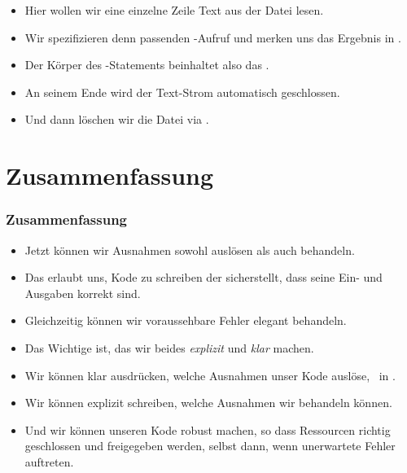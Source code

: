 \documentclass[aspectratio=169,mathserif,notheorems]{beamer}%
\begin{document}
\begin{frame}[t]
{{\begin{itemize}
{}%
%
%
%
%
%
%
%
\item<19-> Hier wollen wir eine einzelne Zeile Text aus der Datei lesen.%
%
\item<20-> Wir spezifizieren denn passenden -Aufruf und merken uns das Ergebnis in .%
%
\item<21-> Der Körper des -Statements beinhaltet also das .%
%
\item<22-> An seinem Ende wird der Text-Strom automatisch geschlossen.%
%
\item<23-> Und dann löschen wir die Datei via .%
\end{itemize}%
}}%
%
%
%
%
%
\end{frame}%
%
\section{Zusammenfassung}%
%
\begin{frame}%
\frametitle{Zusammenfassung}%
\begin{itemize}%
%
\item Jetzt können wir Ausnahmen sowohl auslösen als auch behandeln.%
%
\item<2-> Das erlaubt uns, Kode zu schreiben der sicherstellt, dass seine Ein- und Ausgaben korrekt sind.%
%
\item<3-> Gleichzeitig können wir voraussehbare Fehler elegant behandeln.%
%
\item<4-> Das Wichtige ist, das wir beides \emph{explizit} und \emph{klar} machen.%
%
\item<5-> Wir können klar ausdrücken, welche Ausnahmen unser Kode auslöse, \DEzB\ in .%
%
\item<6-> Wir können explizit schreiben, welche Ausnahmen wir behandeln können.%
%
\item<7-> Und wir können unseren Kode robust machen, so dass Ressourcen richtig geschlossen und freigegeben werden, selbst dann, wenn unerwartete Fehler auftreten.%
%
\end{itemize}%
\end{frame}%
%
\endPresentation%
\end{document}
